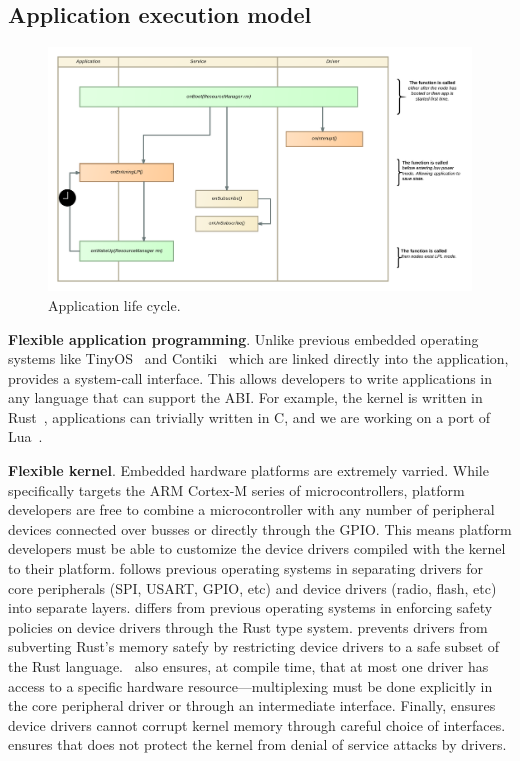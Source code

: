 \subsection{Application execution model}
\begin{figure}
 \centering
\includegraphics[width=1\columnwidth]{img/appcycle.png}
\caption{Application life cycle.}
 \label{fig:appcycle}
\end{figure}

{\bf Flexible application programming}. Unlike previous embedded operating
systems like TinyOS~\cite{tinyos} and Contiki~\cite{contiki} which are linked
directly into the application, \name provides a system-call interface. This
allows developers to write applications in any language that can support the
ABI. For example, the \name kernel is written in Rust~\cite{rust}, applications
can trivially written in C, and we are working on a port of Lua~\cite{lua}.

{\bf Flexible kernel}. Embedded hardware platforms are extremely varried. While
\name specifically targets the ARM Cortex-M series of microcontrollers, platform
developers are free to combine a microcontroller with any number of peripheral
devices connected over busses or directly through the GPIO. This means platform
developers must be able to customize the device drivers compiled with the kernel
to their platform. \name follows previous operating systems in separating
drivers for core peripherals (SPI, USART, GPIO, etc) and device drivers (radio,
flash, etc) into separate layers. \name differs from previous operating systems
in enforcing safety policies on device drivers through the Rust type system.
\name prevents drivers from subverting Rust's memory satefy by restricting
device drivers to a safe subset of the Rust language.~ \name
also ensures, at compile time, that at most one driver has access to a specific
hardware resource---multiplexing must be done explicitly in the core peripheral
driver or through an intermediate interface. Finally, \name ensures device
drivers cannot corrupt kernel memory through careful choice of interfaces. \name
ensures that \name does not protect the kernel from denial of service attacks by
drivers.

